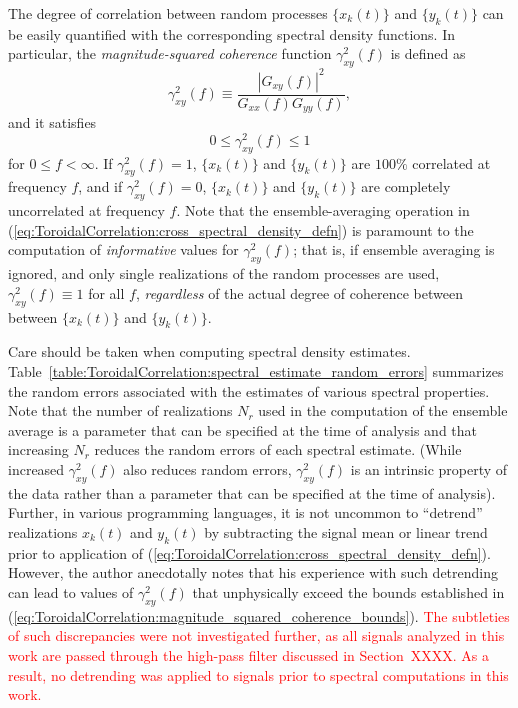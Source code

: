 The degree of correlation between random processes
$\{x_k(t)\}$ and $\{y_k(t)\}$ can be easily quantified
with the corresponding spectral density functions.
In particular, the \emph{magnitude-squared coherence} function
$\gamma_{xy}^2(f)$ is defined as
\begin{equation}
  \gamma_{xy}^2(f)
  \equiv
  \frac{|G_{xy}(f)|^2}{G_{xx}(f) G_{yy}(f)},
  \label{eq:ToroidalCorrelation:magnitude_squared_coherence_defn}
\end{equation}
and it satisfies
\begin{equation}
  0 \leq \gamma_{xy}^2(f) \leq 1
  \label{eq:ToroidalCorrelation:magnitude_squared_coherence_bounds}
\end{equation}
for $0 \leq f < \infty$.
If $\gamma_{xy}^2(f) = 1$,
$\{x_k(t)\}$ and $\{y_k(t)\}$ are $100\%$ correlated at frequency $f$, and
if $\gamma_{xy}^2(f) = 0$,
$\{x_k(t)\}$ and $\{y_k(t)\}$ are completely uncorrelated at frequency $f$.
Note that the ensemble-averaging operation in
(\ref{eq:ToroidalCorrelation:cross_spectral_density_defn})
is paramount to the computation
of \emph{informative} values for $\gamma_{xy}^2(f)$;
that is, if ensemble averaging is ignored, and
only single realizations of the random processes are used,
$\gamma_{xy}^2(f) \equiv 1$ for all $f$,
\emph{regardless} of the actual degree of coherence
between between $\{x_k(t)\}$ and $\{y_k(t)\}$.

Care should be taken when computing spectral density estimates.
Table~\ref{table:ToroidalCorrelation:spectral_estimate_random_errors}
summarizes the random errors associated with the estimates
of various spectral properties.
Note that the number of realizations $N_r$ used
in the computation of the ensemble average
is a parameter that can be specified
at the time of analysis and that
increasing $N_r$ reduces the random errors of each spectral estimate.
(While increased $\gamma_{xy}^2(f)$ also reduces random errors,
$\gamma_{xy}^2(f)$ is an intrinsic property of the data
rather than a parameter that can be specified at the time of analysis).
Further, in various programming languages,
it is not uncommon to ``detrend'' realizations $x_k(t)$ and $y_k(t)$
by subtracting the signal mean or linear trend
prior to application of
(\ref{eq:ToroidalCorrelation:cross_spectral_density_defn}).
However, the author anecdotally notes that his experience with
such detrending can lead to values of $\gamma_{xy}^2(f)$
that unphysically exceed the bounds established in
(\ref{eq:ToroidalCorrelation:magnitude_squared_coherence_bounds}).
\textcolor{red}{%
The subtleties of such discrepancies were not investigated further,
as all signals analyzed in this work
are passed through the high-pass filter
discussed in Section~XXXX.
As a result, no detrending was applied to signals
prior to spectral computations in this work.}

